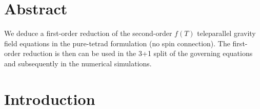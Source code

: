 \documentclass[
10pt, %
a4paper, %
oneside, %
headinclude,footinclude, %
BCOR5mm, %
]{scrartcl}
\begin{document}
\section*{Abstract} %
We deduce a first-order reduction of the second-order $ f(T) $ teleparallel gravity field 
equations 
in the pure-tetrad formulation (no spin connection). The first-order reduction is then can be used 
in the 3+1 split of the governing equations and subsequently in the numerical simulations. 
\renewcommand{\thefootnote}{\arabic{footnote}}


\setlength\parindent{10pt} %
\setlength{\parskip}{5pt} %


\section{Introduction}
\end{document}
